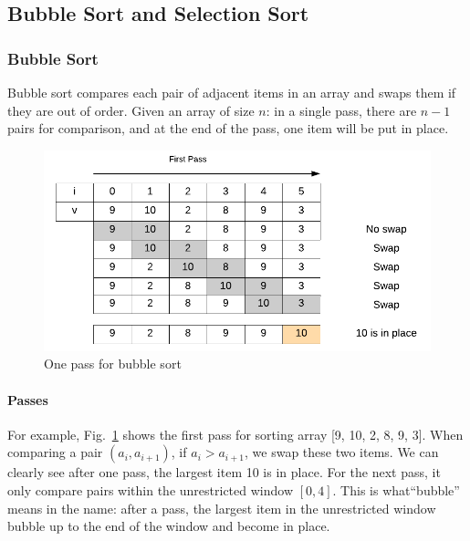 \documentclass[../main.tex]{subfiles}
\begin{document}

\subsection{Bubble Sort and Selection Sort}
\subsubsection{Bubble Sort}
Bubble sort compares each pair of adjacent items in an array and swaps them if they are out of order. Given an array of size $n$: in a single pass, there are $n-1$ pairs  for comparison, and at the end of the pass, one item will be put in place. 
\begin{figure}[H]
    \centering
    \includegraphics{fig/bubble_sort.png}
    \caption{One pass for bubble sort}
    \label{fig:bubble_sort}
\end{figure}

\paragraph{Passes}  For example, Fig.~\ref{fig:bubble_sort} shows the first pass for sorting array [9, 10, 2, 8, 9, 3]. When comparing a pair $(a_i, a_{i+1})$, if $a_i > a_{i+1}$, we swap these two items. We can clearly see after one pass, the largest item 10 is in place. For the next pass, it only compare pairs within the unrestricted window $[0, 4]$.  This is what``bubble'' means in the name: after a pass, the largest item in the unrestricted window bubble up to the end of the window and become in place. 

\end{document}
